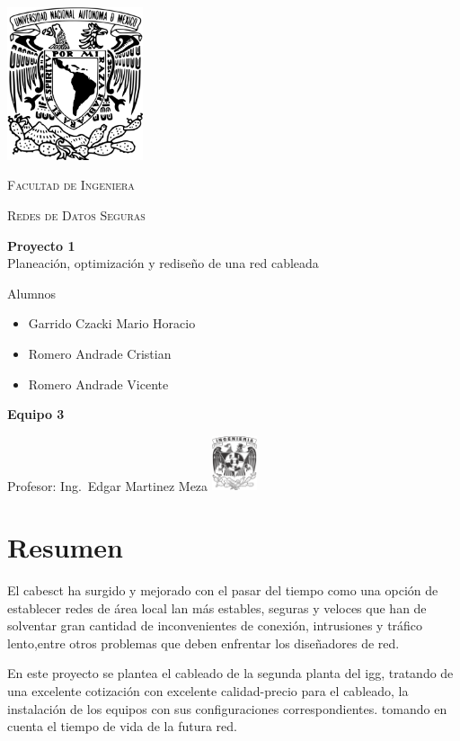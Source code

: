 \documentclass[letterpaper]{article}
\begin{document}
\begin{titlepage}
  \centering
  \includegraphics[width=0.3\textwidth]{unam_logo}\vfill{}
  {\scshape\Huge Facultad de Ingeniera\par}\vspace{0.5cm}
  {\scshape\Large Redes de Datos Seguras\par}\vfill
  {\huge \textbf{Proyecto 1}\\Planeación, optimización y
    rediseño de una red cableada}\vfill
  
  {\Large
    Alumnos\begin{itemize}
    \item Garrido Czacki Mario Horacio
    \item Romero Andrade Cristian
    \item Romero Andrade Vicente

    \end{itemize}
    \textbf{Equipo 3}
  }\vfill
  {\large Profesor: Ing.~Edgar Martinez Meza}\vfill
  \includegraphics[width=0.1\textwidth]{inge_logo}
  
  
\end{titlepage}

\tableofcontents{}\newpage

\section{Resumen}\label{sec:resumen}

El \gls{cabesct}  ha  surgido  y  mejorado  con
el  pasar  del  tiempo  como  una opción de establecer
redes de área local \acrshort{lan} más estables, seguras y veloces
que han de solventar gran cantidad  de inconvenientes de
conexión,  intrusiones y tráfico lento,entre otros problemas
que deben enfrentar los diseñadores de red.

En este proyecto se plantea el cableado de la segunda planta
del \acrfull{igg}, tratando de una excelente cotización
con excelente calidad-precio para el cableado, la instalación de
los equipos con sus configuraciones correspondientes.
tomando en cuenta el tiempo de vida
de la futura red. 
\end{document}
